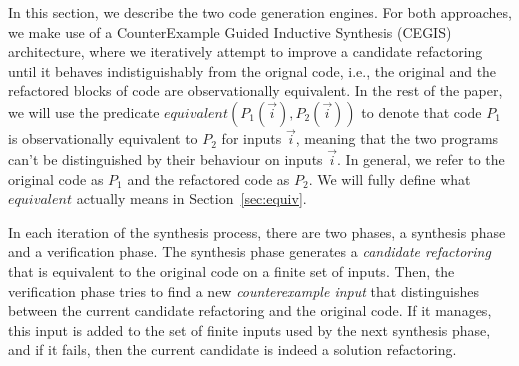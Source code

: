 \documentclass[sigconf,review,anonymous]{acmart}
\begin{document}



In this section, we describe the two code generation engines.
For both approaches, we make use of a CounterExample Guided Inductive Synthesis (CEGIS)~\cite{DBLP:conf/pldi/Solar-LezamaJB08} architecture, where we
iteratively attempt to improve a candidate refactoring
until it behaves indistiguishably
from the orignal code, i.e., the original and
the refactored blocks of code are observationally equivalent.
%
In the rest of the paper, we will use the predicate
$equivalent(P_1(\vec{i}), P_2(\vec{i}))$ to denote that code $P_1$ is
observationally equivalent to $P_2$ for inputs $\vec{i}$, meaning that the two programs
can't be distinguished by their behaviour on inputs $\vec{i}$.  In general,
we refer to the original code as $P_1$ and the refactored code as
$P_2$. We will fully define what $equivalent$ actually means in Section~\ref{sec:equiv}.

In each iteration of the synthesis process, there are two phases, a synthesis phase and a verification phase. The synthesis phase generates a {\em candidate refactoring} that is equivalent to
the original code on a finite set of inputs. Then, the verification phase tries to find a new {\em counterexample input} that distinguishes between the current candidate refactoring and the original code. If it manages, this input is added to the set of finite inputs used by the next synthesis phase, and if it fails, then the current candidate is indeed a solution refactoring.
\end{document}
